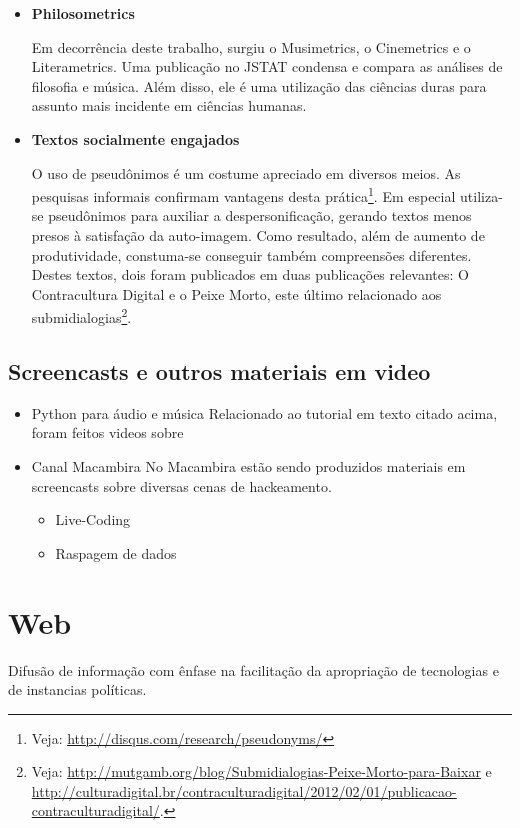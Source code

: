 \begin{itemize}
    \item {\bf Philosometrics}

Em decorrência deste trabalho, surgiu o  Musimetrics,
o Cinemetrics e o Literametrics. Uma publicação no
JSTAT condensa e compara as análises de filosofia
e música.\cite{FabbriJSTAT}
Além disso, ele é uma
utilização das ciências duras para 
assunto mais incidente em ciências humanas. 

    \item {\bf Textos socialmente engajados }

O uso de pseudônimos é um costume apreciado em diversos meios. As pesquisas informais confirmam vantagens desta prática\footnote{Veja: \url{http://disqus.com/research/pseudonyms/}}.
Em especial utiliza-se pseudônimos para
auxiliar a despersonificação, gerando textos menos presos à satisfação da auto-imagem. Como resultado, além de aumento de produtividade, constuma-se conseguir também compreensões diferentes. Destes textos, dois foram publicados em duas publicações relevantes: O Contracultura Digital e o Peixe Morto, este último relacionado aos submidialogias\footnote{Veja: \url{http://mutgamb.org/blog/Submidialogias-Peixe-Morto-para-Baixar} e \url{http://culturadigital.br/contraculturadigital/2012/02/01/publicacao-contraculturadigital/}.}.

 \end{itemize}

\subsection{Screencasts e outros materiais em video}

\begin{itemize}
    \item Python para áudio e música
    Relacionado ao tutorial em texto citado acima, foram feitos videos sobre

    \item Canal Macambira
No Macambira estão sendo produzidos materiais em screencasts sobre
diversas cenas de hackeamento.

    \begin{itemize}
	\item Live-Coding
	\item Raspagem de dados
    \end{itemize}
\end{itemize}





\section{Web}
  Difusão de informação com ênfase na facilitação
  da apropriação de tecnologias e de instancias políticas.

